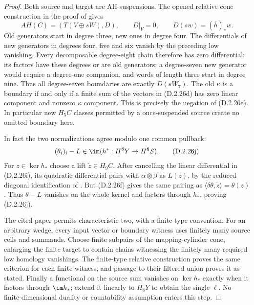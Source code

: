 \begin{proof}
Both source and target are AH-suspensions. The opened relative
cone construction in the proof of
\cite[Proposition 7.4, p.309]{FGHHalperinLemaire1995} gives
\[
 AH(C)=(T(V\oplus sW),D),\qquad
 D|_V=0,\qquad D(sw)=(\bar h)_*w.
 \tag{D.2.26i}
\]
Old generators start in degree three, new ones in degree four.
The differentials of new generators in degrees four, five and
six vanish by the preceding low vanishing. Every decomposable
degree-eight chain therefore has zero differential: its factors
have these degrees or are old generators; a degree-seven new
generator would require a degree-one companion, and words of
length three start in degree nine. Thus all degree-seven
boundaries are exactly $D(sW_7)$. The old $\kappa$ is a boundary
if and only if a finite sum of the vectors in
\textup{(D.2.26d)} has zero linear component and nonzero
$\kappa$ component. This is precisely the negation of
\textup{(D.2.26e)}. In particular new $H_5C$ classes permitted
by a once-suspended source create no omitted boundary here.

In fact the two normalizations agree modulo one common pullback:
\[
 (\theta_i)_i-L\in\im(h^*:H^8Y\to H^8S).
 \tag{D.2.26j}
\]
For $z\in\ker h_*$ choose a lift $\widetilde z\in H_9C$.
After cancelling the linear differential in
\textup{(D.2.26i)}, its quadratic differential pairs with
$\alpha\otimes\beta$ as $L(z)$, by the reduced-diagonal
identification of \cite[\S3.1]{FGHHalperinLemaire1995}.
But \textup{(D.2.26f)} gives the same pairing as
$\langle\delta\theta,\widetilde z\rangle=\theta(z)$.
Thus $\theta-L$ vanishes on the whole kernel and factors
through $h_*$, proving \textup{(D.2.26j)}.

The cited paper permits characteristic two, with a finite-type
convention. For an arbitrary wedge, every input vector or
boundary witness uses finitely many source cells and summands.
Choose finite subpairs of the mapping-cylinder cone, enlarging
the finite target to contain chains witnessing the finitely many
required low homology vanishings. The finite-type relative
construction proves the same criterion for each finite witness,
and passage to their filtered union proves it as stated.
Finally a functional on the source sum vanishes on $\ker h_*$
exactly when it factors through $\im h_*$; extend it linearly to
$H_8Y$ to obtain the single $\ell$. No finite-dimensional duality
or countability assumption enters this step.
\end{proof}
